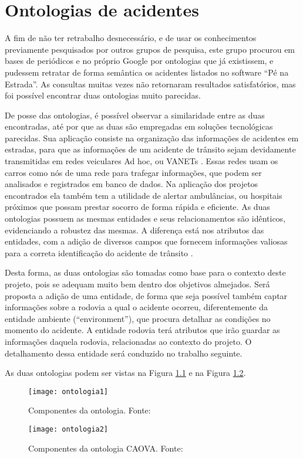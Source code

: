 \chapter{Ontologias de acidentes}

  A fim de não ter retrabalho desnecessário, e de usar os conhecimentos previamente
  pesquisados por outros grupos de pesquisa, este grupo procurou em bases de periódicos e no
  próprio Google por ontologias que já existissem, e pudessem retratar de forma semântica os
  acidentes listados no software “Pé na Estrada”. As consultas muitas vezes não retornaram
  resultados satisfatórios, mas foi possível encontrar duas ontologias muito parecidas.
  
  De posse das ontologias, é possível observar a similaridade entre as duas encontradas,
  até por que as duas são empregadas em soluções tecnológicas parecidas. Sua aplicação
  consiste na organização das informações de acidentes em estradas, para que as informações de
  um acidente de trânsito sejam devidamente transmitidas em redes veiculares Ad hoc, ou
  VANETs \cite{barrachina12}. Essas redes usam os carros como nós de uma rede para
  trafegar informações, que podem ser analisados e registrados em banco de dados. Na
  aplicação dos projetos encontrados ela também tem a utilidade de alertar ambulâncias, ou
  hospitais próximos que possam prestar socorro de forma rápida e eficiente. As duas
  ontologias possuem as mesmas entidades e seus relacionamentos são idênticos, evidenciando
  a robustez das mesmas. A diferença está nos atributos das entidades, com a adição de diversos
  campos que fornecem informações valiosas para a correta identificação do acidente de
  trânsito \cite{villalba14}.
  
  Desta forma, as duas ontologias são tomadas como base para o contexto deste projeto,
  pois se adequam muito bem dentro dos objetivos almejados. Será proposta a adição de uma
  entidade, de forma que seja possível também captar informações sobre a rodovia a qual o
  acidente ocorreu, diferentemente da entidade ambiente (“environment”), que procura detalhar
  as condições no momento do acidente. A entidade rodovia terá atributos que irão guardar as
  informações daquela rodovia, relacionadas ao contexto do projeto. O detalhamento dessa
  entidade será conduzido no trabalho seguinte.
  
  As duas ontologias podem ser vistas na Figura \ref{fig:ontologia1} e na Figura \ref{fig:ontologia2}.
  
  \begin{figure}[!htb]
    \centering
    \texttt{[image: ontologia1]}
    \caption[Componentes da ontologia]{Componentes da ontologia. Fonte: \cite{villalba14}}
    \label{fig:ontologia1}
  \end{figure}
  
    \begin{figure}[!htb]
    \centering
    \texttt{[image: ontologia2]}
    \caption[Componentes da ontologia CAOVA]{Componentes da ontologia CAOVA. Fonte: \cite{barrachina12}}
    \label{fig:ontologia2}
  \end{figure}